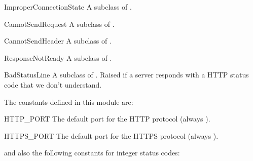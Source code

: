 \begin{excdesc}{ImproperConnectionState}
A subclass of .
\end{excdesc}

\begin{excdesc}{CannotSendRequest}
A subclass of .
\end{excdesc}

\begin{excdesc}{CannotSendHeader}
A subclass of .
\end{excdesc}

\begin{excdesc}{ResponseNotReady}
A subclass of .
\end{excdesc}

\begin{excdesc}{BadStatusLine}
A subclass of .  Raised if a server responds with a
HTTP status code that we don't understand.
\end{excdesc}

The constants defined in this module are:

\begin{datadesc}{HTTP_PORT}
  The default port for the HTTP protocol (always ).
\end{datadesc}

\begin{datadesc}{HTTPS_PORT}
  The default port for the HTTPS protocol (always ).
\end{datadesc}

and also the following constants for integer status codes:

